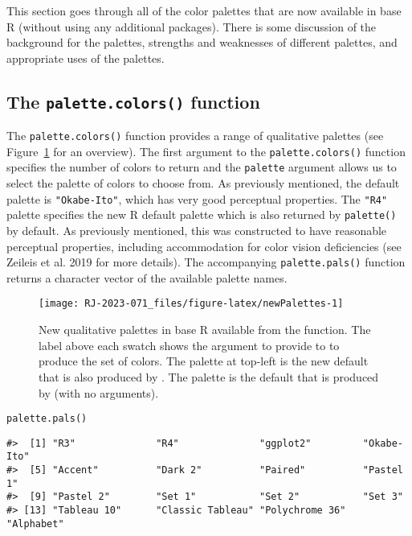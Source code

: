 This section goes through all of the color palettes that are now
available in base R (without using any additional packages).
There is some discussion of the background for the palettes,
strengths and weaknesses of different palettes, and
appropriate uses of the palettes.

\hypertarget{the-palette.colors-function-1}{%
\subsection{\texorpdfstring{The \texttt{palette.colors()} function}{The palette.colors() function}}\label{the-palette.colors-function-1}}

The \texttt{palette.colors()} function provides a range of qualitative palettes (see
Figure~\ref{fig:newPalettes} for an overview).
The first argument to the \texttt{palette.colors()} function specifies
the number of colors to return and
the \texttt{palette} argument allows us to select the palette of colors
to choose from. As previously mentioned, the default palette
is \texttt{"Okabe-Ito"}, which has very good perceptual properties.
The \texttt{"R4"} palette specifies the new R default palette
which is also returned by \texttt{palette()} by default.
As previously mentioned, this was constructed to have
reasonable perceptual properties, including accommodation for
color vision deficiencies (see Zeileis et al. 2019 for more details).
The accompanying \texttt{palette.pals()} function returns a character
vector of the available palette names.

\begin{figure}[ht!]

{\centering \texttt{[image: RJ-2023-071\_files/figure-latex/newPalettes-1]} 

}

\caption{New qualitative palettes in base R available from the  function.  The label above each swatch shows the argument to provide to  to produce the set of colors.  The palette at top-left is the new default that is also produced by .  The  palette is the default that is produced by  (with no arguments).}\label{fig:newPalettes}
\end{figure}

\begin{verbatim}
palette.pals()
\end{verbatim}

\begin{verbatim}
#>  [1] "R3"              "R4"              "ggplot2"         "Okabe-Ito"      
#>  [5] "Accent"          "Dark 2"          "Paired"          "Pastel 1"       
#>  [9] "Pastel 2"        "Set 1"           "Set 2"           "Set 3"          
#> [13] "Tableau 10"      "Classic Tableau" "Polychrome 36"   "Alphabet"
\end{verbatim}

